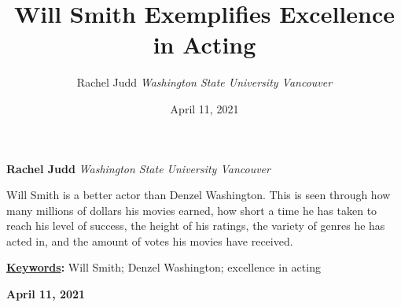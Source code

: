 \documentclass[]{article}
\title{\textbf{\textcolor{WSU.crimson}{Will Smith Exemplifies Excellence
in Acting}}  }
\author{\Large Rachel
Judd\vspace{0.05in} \newline\normalsize\emph{Washington State University
Vancouver}  }
\date{April 11, 2021}
\newcommand*{\authorfont}{\fontfamily{phv}\selectfont}
\renewenvironment{abstract}
 {{%
    \setlength{\leftmargin}{0mm}
    \setlength{\rightmargin}{\leftmargin}%
  }%
  \relax}
 {\endlist}
\begin{document}
	
%    


{%
\setlength{\parindent}{0pt}
\thispagestyle{plain}
{\fontsize{18}{20}\selectfont\raggedright 
\maketitle  %

}

{
   \vskip 13.5pt\relax \normalsize\fontsize{11}{12} 
   
\textbf{\authorfont Rachel Judd} \hskip 15pt \emph{\small Washington
State University Vancouver}   

}

}








\begin{abstract}

    \hbox{\vrule height .2pt width 39.14pc}

    \vskip 8.5pt %

\noindent Will Smith is a better actor than Denzel Washington. This is
seen through how many millions of dollars his movies earned, how short a
time he has taken to reach his level of success, the height of his
ratings, the variety of genres he has acted in, and the amount of votes
his movies have received.


\vskip 8.5pt \noindent \textbf{\underline{Keywords}:} Will Smith; Denzel
Washington; excellence in acting \par

    




    
    \hbox{\vrule height .2pt width 39.14pc}
    \vskip 5pt 
    \hfill \textbf{\textcolor{WSU.gray}{ April 11, 2021 } }
    \vskip 5pt 
    
\end{abstract}


\vskip -8.5pt




\noindent  
\end{document}
